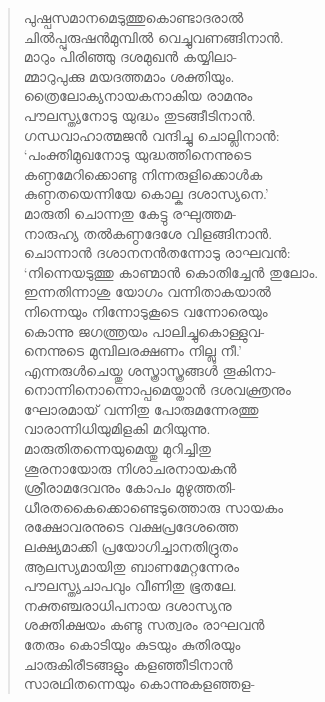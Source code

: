 \begin{verse}
പുഷ്പസമാനമെടുത്തുകൊണ്ടാദരാല്‍\\
ചില്‍പ്പുരുഷന്‍മുമ്പില്‍ വെച്ചുവണങ്ങിനാന്‍.\\
മാറും പിരിഞ്ഞു ദശമുഖന്‍ കയ്യിലാ-\\
മ്മാറുപുക്കു മയദത്തമാം ശക്തിയും.\\
ത്രൈലോക്യനായകനാകിയ രാമനും\\
പൗലസ്ത്യനോടു യുദ്ധം തുടങ്ങീടിനാന്‍.\\
ഗന്ധവാഹാത്മജന്‍ വന്ദിച്ചു ചൊല്ലിനാന്‍:\\
‘പംക്തിമുഖനോടു യുദ്ധത്തിനെന്നുടെ\\
കണ്ഠമേറിക്കൊണ്ടു നിന്നരുളിക്കൊള്‍ക\\
കുണ്ഠതയെന്നിയേ കൊല്ക ദശാസ്യനെ.’\\
മാരുതി ചൊന്നതു കേട്ടു രഘുത്തമ-\\
നാരുഹ്യ തല്‍കണ്ഠദേശേ വിളങ്ങിനാന്‍.\\
ചൊന്നാന്‍ ദശാനനന്‍തന്നോടു രാഘവന്‍:\\
‘നിന്നെയടുത്തു കാണ്മാന്‍ കൊതിച്ചേന്‍ തുലോം.\\
ഇന്നതിന്നാശു യോഗം വന്നിതാകയാല്‍\\
നിന്നെയും നിന്നോടുകൂടെ വന്നോരെയും\\
കൊന്നു ജഗത്ത്രയം പാലിച്ചുകൊള്ളുവ-\\
നെന്നുടെ മുമ്പിലരക്ഷണം നില്ലു നീ.’\\
എന്നരുള്‍ചെയ്തു ശസ്ത്രാസ്ത്രങ്ങള്‍ തൂകിനാ-\\
നൊന്നിനൊന്നൊപ്പമെയ്താന്‍ ദശവക്ത്രനും\\
ഘോരമായ് വന്നിതു പോരുമന്നേരത്തു\\
വാരാന്നിധിയുമിളകി മറിയുന്നു.\\
മാരുതിതന്നെയുമെയ്തു മുറിച്ചിതു\\
ശൂരനായോരു നിശാചരനായകന്‍\\
ശ്രീരാമദേവനും കോപം മുഴുത്തതി-\\
ധീരതകൈക്കൊണ്ടെടുത്തൊരു സായകം\\
രക്ഷോവരനുടെ വക്ഷപ്രദേശത്തെ\\
ലക്ഷ്യമാക്കി പ്രയോഗിച്ചാനതിദ്രുതം\\
ആലസ്യമായിതു ബാണമേറ്റന്നേരം\\
പൗലസ്ത്യചാപവും വീണിതു ഭൂതലേ.\\
നക്തഞ്ചരാധിപനായ ദശാസ്യനു\\
ശക്തിക്ഷയം കണ്ടു സത്വരം രാഘവന്‍\\
തേരും കൊടിയും കുടയും കുതിരയും\\
ചാരുകിരീടങ്ങളും കളഞ്ഞീടിനാന്‍\\
സാരഥിതന്നെയും കൊന്നുകളഞ്ഞള-\\

\end{verse}

